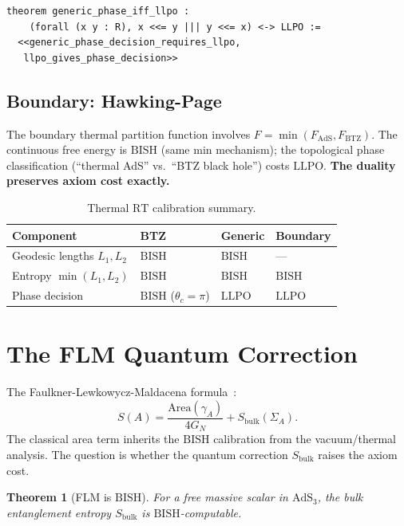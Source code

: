\documentclass[11pt,a4paper]{article}
\theoremstyle{plain}
\newtheorem{theorem}{Theorem}[section]
\theoremstyle{definition}
\newcommand{\LLPO}{\ensuremath{\mathrm{LLPO}}}
\newcommand{\BISH}{\ensuremath{\mathrm{BISH}}}
\newcommand{\AdS}{\ensuremath{\mathrm{AdS}}}
\newcommand{\RT}{\ensuremath{\mathrm{RT}}}
\newcommand{\GN}{\ensuremath{G_N}}
\begin{document}
\begin{lstlisting}[caption={Phase decision equivalence: \texttt{ThermalBTZ.lean}}]
theorem generic_phase_iff_llpo :
    (forall (x y : R), x <<= y ||| y <<= x) <-> LLPO :=
  <<generic_phase_decision_requires_llpo,
   llpo_gives_phase_decision>>
\end{lstlisting}

\subsection{Boundary: Hawking-Page}

The boundary thermal partition function involves
$F = \min(F_{\AdS}, F_{\mathrm{BTZ}})$.
The continuous free energy is $\BISH$ (same min mechanism);
the topological phase classification (``thermal AdS'' vs.\
``BTZ black hole'') costs $\LLPO$.
\textbf{The duality preserves axiom cost exactly.}

\begin{table}[ht]
\centering
\begin{tabular}{@{}llll@{}}
\toprule
\textbf{Component} & \textbf{BTZ} & \textbf{Generic} & \textbf{Boundary} \\
\midrule
Geodesic lengths $L_1, L_2$ & $\BISH$ & $\BISH$ & --- \\
Entropy $\min(L_1, L_2)$ & $\BISH$ & $\BISH$ & $\BISH$ \\
Phase decision & $\BISH$ ($\theta_c = \pi$) & $\LLPO$ & $\LLPO$ \\
\bottomrule
\end{tabular}
\caption{Thermal $\RT$ calibration summary.}
\label{tab:thermal}
\end{table}

\section{The FLM Quantum Correction}\label{sec:flm}

The Faulkner-Lewkowycz-Maldacena formula~\cite{FLM2013}:
\[
  S(A) = \frac{\mathrm{Area}(\gamma_A)}{4\GN} + S_{\mathrm{bulk}}(\Sigma_A).
\]
The classical area term inherits the $\BISH$ calibration from the
vacuum/thermal analysis.  The question is whether the quantum
correction $S_{\mathrm{bulk}}$ raises the axiom cost.

\begin{theorem}[FLM is $\BISH$]\label{thm:flm}
For a free massive scalar in $\AdS_3$, the bulk entanglement
entropy $S_{\mathrm{bulk}}$ is $\BISH$-computable.
\end{theorem}
\end{document}

